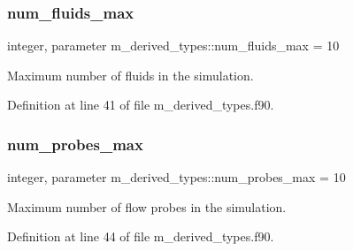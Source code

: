 \subsubsection{\texorpdfstring{num\+\_\+fluids\+\_\+max}{num\_fluids\_max}}
{\footnotesize\ttfamily integer, parameter m\+\_\+derived\+\_\+types\+::num\+\_\+fluids\+\_\+max = 10}



Maximum number of fluids in the simulation. 



Definition at line 41 of file m\+\_\+derived\+\_\+types.\+f90.

\mbox{\label{namespacem__derived__types_aa02f02777c477f6be0f89717ab209441}} 
\subsubsection{\texorpdfstring{num\+\_\+probes\+\_\+max}{num\_probes\_max}}
{\footnotesize\ttfamily integer, parameter m\+\_\+derived\+\_\+types\+::num\+\_\+probes\+\_\+max = 10}



Maximum number of flow probes in the simulation. 



Definition at line 44 of file m\+\_\+derived\+\_\+types.\+f90.


